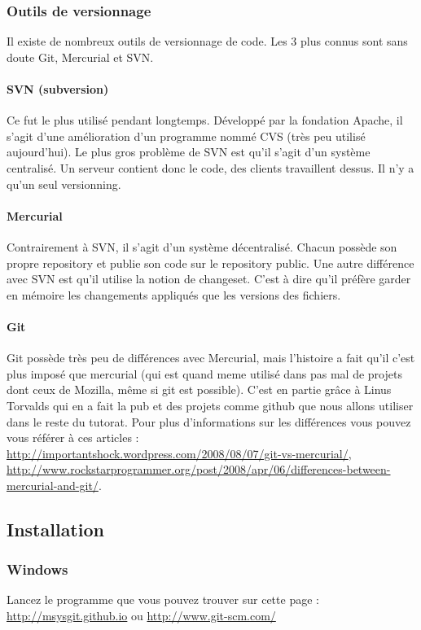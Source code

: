 \documentclass[a4paper,10pt]{article}
\begin{document}
    \subsubsection{Outils de versionnage}
Il existe de nombreux outils de versionnage de code. Les 3 plus connus sont sans doute Git, Mercurial et SVN.
      \paragraph{SVN (subversion)}
Ce fut le plus utilisé pendant longtemps. Développé par la fondation Apache, il s'agit d'une amélioration d'un programme nommé CVS (très peu utilisé aujourd'hui). Le plus gros problème de SVN est qu'il s'agit d'un système centralisé. Un serveur contient donc le code, des clients travaillent dessus. Il n'y a qu'un seul versionning.
      \paragraph{Mercurial}
Contrairement à SVN, il s'agit d'un système décentralisé. Chacun possède son propre repository et publie son code sur le repository public. Une autre différence avec SVN est qu'il utilise la notion de changeset. C'est à dire qu'il préfère garder en mémoire les changements appliqués que les versions des fichiers.
      \paragraph{Git}
Git possède très peu de différences avec Mercurial, mais l'histoire a fait qu'il c'est plus imposé que mercurial (qui est quand meme utilisé dans pas mal de projets dont ceux de Mozilla, même si git est possible).
C'est en partie grâce à Linus Torvalds qui en a fait la pub et des projets comme github que nous allons utiliser dans le reste du tutorat.
Pour plus d'informations sur les différences vous pouvez vous référer à ces articles : \url{http://importantshock.wordpress.com/2008/08/07/git-vs-mercurial/}, \url{http://www.rockstarprogrammer.org/post/2008/apr/06/differences-between-mercurial-and-git/}.
  \subsection{Installation}
    \subsubsection{Windows}
Lancez le programme que vous pouvez trouver sur cette page : \url{http://msysgit.github.io} ou \url{http://www.git-scm.com/}
\end{document}
